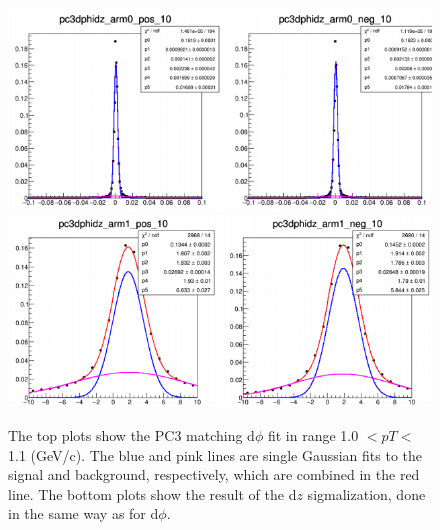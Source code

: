 \begin{figure}[h!]
\begin{center}
\includegraphics[scale=0.45]{figs/pc3dphi.png}
\includegraphics[scale=0.45]{figs/pc3dz.png}
\end{center}
\label{fig:pc3_sig}
\caption{The top plots show the PC3 matching d$\phi$ fit in range 1.0 $< pT <$ 1.1 (GeV/c).
The blue and pink lines are single Gaussian fits to the signal and background, respectively, which are combined in the red line.
The bottom plots show the result of the d$z$ sigmalization, done in the same way as for d$\phi$.}
\end{figure}


